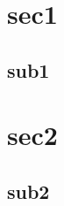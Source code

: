 \documentclass{beamer}
\begin{document}
\section{sec1}
\subsection{sub1}

\section{sec2}
\subsection{sub2}
\end{document}
